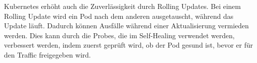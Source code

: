 Kubernetes erhöht auch die Zuverlässigkeit durch Rolling Updates. Bei einem Rolling Update wird ein Pod nach dem anderen ausgetauscht, während das Update läuft. Dadurch können Ausfälle während einer Aktualisierung vermieden werden.
Dies kann durch die Probes, die im Self-Healing verwendet werden, verbessert werden, indem zuerst geprüft wird, ob der Pod gesund ist, bevor er für den Traffic freigegeben wird.
